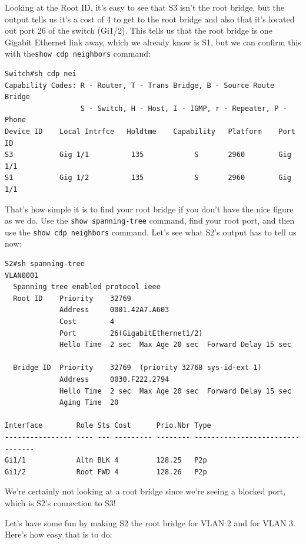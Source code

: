 Looking at the Root ID, it's easy to see that S3 isn't the root bridge,
but the output tells us it's a cost of 4 to get to the root bridge and
also that it's located out port 26 of the switch (Gi1/2). This tells us
that the root bridge is one Gigabit Ethernet link away,
which we already know
is S1, but we can confirm this with the\texttt{show\ cdp\ neighbors}
command:

\begin{verbatim}
Switch#sh cdp nei
Capability Codes: R - Router, T - Trans Bridge, B - Source Route Bridge
                  S - Switch, H - Host, I - IGMP, r - Repeater, P - Phone
Device ID    Local Intrfce   Holdtme    Capability   Platform    Port ID
S3           Gig 1/1          135            S       2960        Gig 1/1
S1           Gig 1/2          135            S       2960        Gig 1/1
\end{verbatim}

That's how simple it is to find your root bridge if you don't have the
nice figure as we do. Use the \texttt{show\ spanning-tree} command, find
your root port, and then use the \texttt{show\ cdp\ neighbors} command.
Let's see what S2's output has to tell us now:

\begin{verbatim}
S2#sh spanning-tree
VLAN0001
  Spanning tree enabled protocol ieee
  Root ID    Priority    32769
             Address     0001.42A7.A603
             Cost        4
             Port        26(GigabitEthernet1/2)
             Hello Time  2 sec  Max Age 20 sec  Forward Delay 15 sec
 
  Bridge ID  Priority    32769  (priority 32768 sys-id-ext 1)
             Address     0030.F222.2794
             Hello Time  2 sec  Max Age 20 sec  Forward Delay 15 sec
             Aging Time  20
 
Interface        Role Sts Cost      Prio.Nbr Type
---------------- ---- --- --------- -------- --------------------------------
Gi1/1            Altn BLK 4         128.25   P2p
Gi1/2            Root FWD 4         128.26   P2p
\end{verbatim}

We're certainly not looking at a root bridge since we're seeing a
blocked port, which is S2's connection to S3!

Let's have some fun by making S2 the root bridge for VLAN 2 and for VLAN
3. Here's how easy that is to do:

